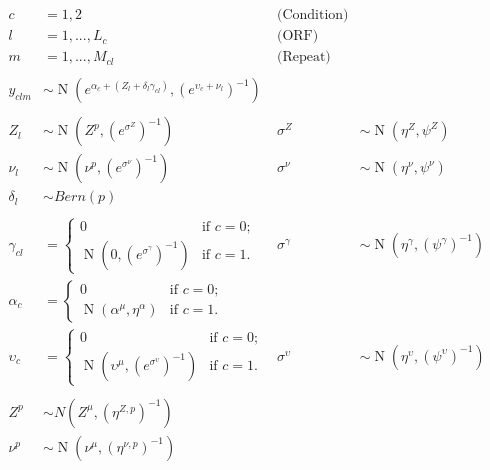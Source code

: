 \documentclass[11pt,a4paper]{article}
\begin{document}
\begin{align*}
c&=1,2 \qquad & \text{(Condition)}\\
l&=1,...,L_{c} \qquad & \text{(ORF)}\\
m&=1,...,M_{cl} \qquad & \text{(Repeat)}\\
\\
y_{clm} &\sim \operatorname{N}(e^{\alpha_{c}+(Z_{l}+\delta_{l}\gamma_{cl})},(e^{ \upsilon_{c}+\nu_{l}  })^{-1})\\
\\
Z_{l} &\sim \operatorname{N}(Z^{p},{(e^{\sigma^{Z}})}^{-1}) &\sigma^{Z} &\sim \operatorname{N}(\eta^{Z},\psi^{Z})\\
\nu_{l} &\sim \operatorname{N}(\nu^p,{ (e^{{\sigma}^{\nu}} )}^{-1} ) &\sigma^{\nu} &\sim \operatorname{N}(\eta^{\nu}, \psi^{\nu} )\\
\delta_{l} &\sim Bern(p)\\
\\
\gamma_{cl}&=\begin{cases}
0  & \text{if } c=0;\\
\operatorname{N}(0,{(e^{\sigma^{\gamma}})}^{-1}) & \text{if } c=1.
\end{cases}
&\sigma^{\gamma}&\sim \operatorname{N}(\eta^{\gamma},{(\psi^{\gamma})}^{-1})
\\
\alpha_{c}&=\begin{cases}
0  & \text{if } c=0;\\
\operatorname{N}(\alpha^\mu,\eta^{\alpha}) & \text{if } c=1.
\end{cases}\\
\upsilon_{c}&=\begin{cases}
0  & \text{if } c=0;\\
\operatorname{N}(\upsilon^{\mu},({e^{\sigma^{\upsilon}}})^{-1}) & \text{if } c=1.
\end{cases}
&\sigma^{\upsilon} &\sim \operatorname{N}(\eta^{\upsilon}, (\psi^{\upsilon})^{-1} )\\
\\
Z^{p} &\sim N(Z^{\mu},{(\eta^{Z,p})}^{-1}) \\
\nu^p &\sim \operatorname{N}(\nu^{\mu}, (\eta^{\nu,p})^{-1} )
\end{align*}






\end{document}
